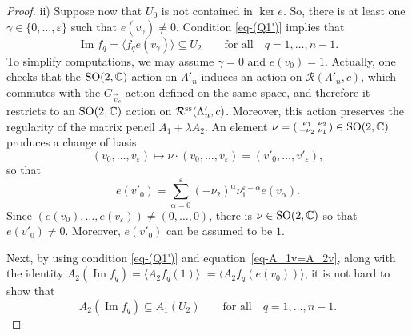 \begin{proof}
 ii) Suppose now that $U_{0}$ is not contained in $\ker e$. So, there is at least one $\gamma\in \{0,\dots, \varepsilon\}$ such that
 $e(v_\gamma) \neq 0$. Condition \eqref{eq-(Q1')} implies that
 \begin{equation}
\operatorname{Im} f_{q}= \langle f_{q}e(v_{\gamma})\rangle \subseteq U_{2}\qquad\text{for all}\quad q=1,\dots,n-1 .
\label{eq-imf-in-V}
\end{equation}
To simplify computations, we may assume $\gamma =0$ and $e(v_0)=1$.
 Actually, one checks that the ${\rm SO}(2,\mathbb{C})$ action on $\Lambda'_n$ induces an action on $\mathcal{R}(\Lambda'_{n}, c)$, which commutes with the $G_{\vec{v}_c}$ action defined on the same space, and therefore it restricts to an ${\rm SO}(2,\mathbb{C})$ action on $\mathcal{R}^{\rm ss}(\Lambda'_{n}, c)$. Moreover, this action preserves the regularity of the matrix pencil
 $A_1 + \lambda A_2$. An element $\nu= \left(\begin{smallmatrix} \nu_1 & \nu_2 \\ -\nu_2 & \nu_1\end{smallmatrix}\right)\in {\rm SO}(2,\mathbb{C})$ produces a change of basis
 \[(v_0, \dots, v_{\varepsilon}) \mapsto \nu \cdot (v_0, \dots, v_{\varepsilon}) = (v'_0, \dots, v'_{\varepsilon}) ,\]
 so that
\begin{equation*}
e(v'_{0})=\sum_{\alpha=0}^{\varepsilon}(-\nu_{2})^{\alpha}\nu_{1}^{\varepsilon-\alpha}e(v_{\alpha}) .
\end{equation*}
Since $(e(v_{0}),\dots,e(v_{\varepsilon}))\neq(0,\dots,0)$, there is $\nu\in {\rm SO}(2, \mathbb{C})$ so that $e(v'_{0})\neq0$. Moreover, $e(v'_0)$ can be assumed to be $1$.

Next, by using condition \eqref{eq-(Q1')} and equation~\eqref{eq-A_1v=A_2v}, along with the identity
$A_{2}(\operatorname{Im} f_{q}) =\langle A_{2}f_{q}(1)\rangle$ $ = \langle A_{2}f_{q}(e(v_0))\rangle$, it is not hard to show that
\begin{equation}
A_{2}(\operatorname{Im} f_{q})\subseteq A_{1}(U_{2})\qquad\text{for all}\quad q=1,\dots,n-1 .
\label{eq-A_2(im-f)}
\end{equation}



\end{proof}

